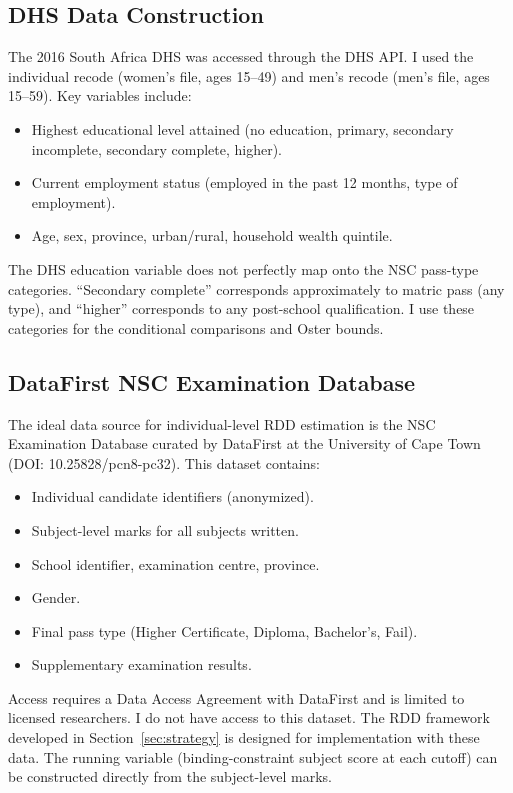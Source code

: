 \documentclass[12pt]{article}
\begin{document}
\subsection{DHS Data Construction}

The 2016 South Africa DHS was accessed through the DHS API. I used the individual recode (women's file, ages 15--49) and men's recode (men's file, ages 15--59). Key variables include:
\begin{itemize}
    \item Highest educational level attained (no education, primary, secondary incomplete, secondary complete, higher).
    \item Current employment status (employed in the past 12 months, type of employment).
    \item Age, sex, province, urban/rural, household wealth quintile.
\end{itemize}

The DHS education variable does not perfectly map onto the NSC pass-type categories. ``Secondary complete'' corresponds approximately to matric pass (any type), and ``higher'' corresponds to any post-school qualification. I use these categories for the conditional comparisons and Oster bounds.

\subsection{DataFirst NSC Examination Database}

The ideal data source for individual-level RDD estimation is the NSC Examination Database curated by DataFirst at the University of Cape Town (DOI: 10.25828/pcn8-pc32). This dataset contains:
\begin{itemize}
    \item Individual candidate identifiers (anonymized).
    \item Subject-level marks for all subjects written.
    \item School identifier, examination centre, province.
    \item Gender.
    \item Final pass type (Higher Certificate, Diploma, Bachelor's, Fail).
    \item Supplementary examination results.
\end{itemize}

Access requires a Data Access Agreement with DataFirst and is limited to licensed researchers. I do not have access to this dataset. The RDD framework developed in Section~\ref{sec:strategy} is designed for implementation with these data. The running variable (binding-constraint subject score at each cutoff) can be constructed directly from the subject-level marks.
\end{document}
